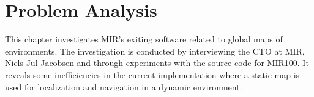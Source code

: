 \chapter{Problem Analysis}
This chapter investigates MIR’s exiting software related to global maps of environments. The investigation is conducted by interviewing the CTO at MIR, Niels Jul Jacobsen and through experiments with the source code for MIR100. It reveals some inefficiencies in the current implementation where a static map is used for localization and navigation in a dynamic environment.









